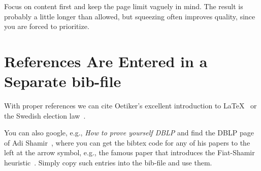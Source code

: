 \documentclass[11pt,twoside]{article}
\begin{document}
Focus on content first and keep the page limit vaguely in mind. The
result is probably a little longer than allowed, but squeezing often
improves quality, since you are forced to prioritize.

\section{References Are Entered in a Separate bib-file}

With proper references we can cite Oetiker's excellent introduction to
\LaTeX~\cite{Oetiker2007} or the Swedish election law~\cite{vallag}.

You can also google, e.g., \emph{How to prove yourself DBLP} and find
the DBLP page of Adi Shamir~\cite{dblpshamir}, where you can get the
bibtex code for any of his papers to the left at the arrow symbol,
e.g., the famous paper that introduces the Fiat-Shamir
heuristic~\cite{DBLP:conf/crypto/FiatS86}. Simply copy such entries
into the bib-file and use them.

%
%
%
%


\end{document}
